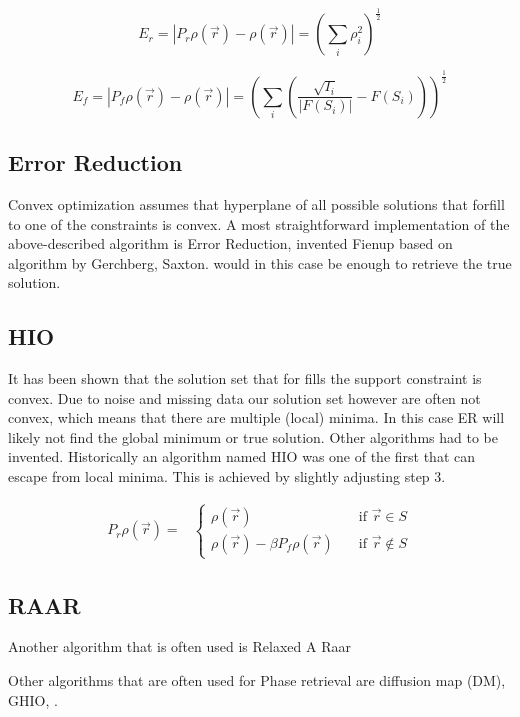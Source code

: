 \begin{equation}
E_r = \left|P_r\rho(\vec{r}) - \rho(\vec{r})\right| = \left(\sum_i\rho_i^2\right)^{\frac{1}{2}}
\end{equation}

\begin{equation}
E_f = \left|P_f\rho(\vec{r}) - \rho(\vec{r})\right| = \left(\sum_{i}\left(\frac{\sqrt{I_i}}{|F(S_i)|}- F(S_i)\right)\right)^{\frac{1}{2}}
\end{equation}

\subsection{Error Reduction}
Convex optimization assumes that hyperplane of all possible solutions that forfill to one of the constraints is convex. A most straightforward implementation of the above-described algorithm is Error Reduction, invented Fienup based on algorithm by Gerchberg, Saxton. would in this case be enough to retrieve the true solution.  

\subsection{HIO}
It has been shown that the solution set that for fills the support constraint is convex. Due to noise and missing data our solution set however are often not convex, which means that there are multiple (local) minima. In this case ER will likely not find the global minimum or true solution. Other algorithms had to be invented. Historically an algorithm named HIO was one of the first that can escape from local minima. This is achieved by slightly adjusting step 3.

\begin{align}
P_r \rho\left(\vec{r}\right) =& \begin{cases} \rho\left(\vec{r}\right) \quad &\mathrm{if}\,\,
    \vec{r} \in S\\\rho(\vec{r}) -\beta P_f \rho(\vec{r}) \quad & \mathrm{if}\,\, \vec{r} \not\in S \end{cases}
\end{align}
 

\subsection{RAAR}
Another algorithm that is often used is Relaxed A
Raar 

Other algorithms that are often used for Phase retrieval are diffusion map (DM), GHIO, .

